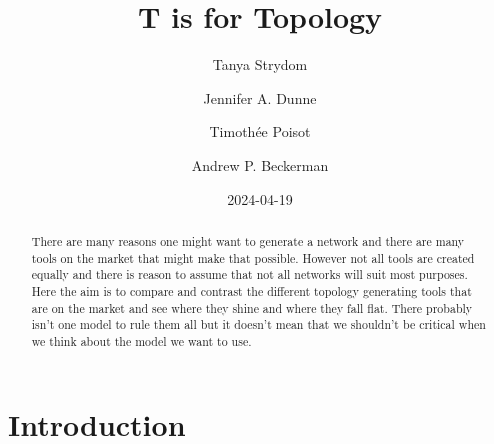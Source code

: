 \documentclass[
  letterpaper,
  DIV=11,
  numbers=noendperiod]{scrartcl}
\title{T is for Topology}
\author{Tanya Strydom \and Jennifer A. Dunne \and Timothée
Poisot \and Andrew P. Beckerman}
\date{2024-04-19}
\begin{document}
\maketitle
\begin{abstract}
There are many reasons one might want to generate a network and there
are many tools on the market that might make that possible. However not
all tools are created equally and there is reason to assume that not all
networks will suit most purposes. Here the aim is to compare and
contrast the different topology generating tools that are on the market
and see where they shine and where they fall flat. There probably isn't
one model to rule them all but it doesn't mean that we shouldn't be
critical when we think about the model we want to use.
\end{abstract}

\section{Introduction}\label{introduction}
\end{document}
